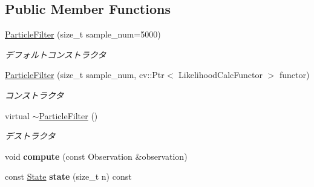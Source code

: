 \subsection*{Public Member Functions}
\begin{DoxyCompactItemize}
\item 
\hypertarget{classskl_1_1_particle_filter_acb38d20f662a6c11bdae4f52f5527943}{}\label{classskl_1_1_particle_filter_acb38d20f662a6c11bdae4f52f5527943} 
\hyperlink{classskl_1_1_particle_filter_acb38d20f662a6c11bdae4f52f5527943}{Particle\+Filter} (size\+\_\+t sample\+\_\+num=5000)
\begin{DoxyCompactList}\small\item\em デフォルトコンストラクタ \end{DoxyCompactList}\item 
\hypertarget{classskl_1_1_particle_filter_a20b8b32eb36de639b614dc3d48e1aa22}{}\label{classskl_1_1_particle_filter_a20b8b32eb36de639b614dc3d48e1aa22} 
\hyperlink{classskl_1_1_particle_filter_a20b8b32eb36de639b614dc3d48e1aa22}{Particle\+Filter} (size\+\_\+t sample\+\_\+num, cv\+::\+Ptr$<$ Likelihood\+Calc\+Functor $>$ functor)
\begin{DoxyCompactList}\small\item\em コンストラクタ \end{DoxyCompactList}\item 
\hypertarget{classskl_1_1_particle_filter_a064210a454753bd675b05b4c7606cfe0}{}\label{classskl_1_1_particle_filter_a064210a454753bd675b05b4c7606cfe0} 
virtual \hyperlink{classskl_1_1_particle_filter_a064210a454753bd675b05b4c7606cfe0}{$\sim$\+Particle\+Filter} ()
\begin{DoxyCompactList}\small\item\em デストラクタ \end{DoxyCompactList}\item 
\hypertarget{classskl_1_1_particle_filter_ab9a3888afe33833f9b764e5c60645758}{}\label{classskl_1_1_particle_filter_ab9a3888afe33833f9b764e5c60645758} 
void {\bfseries compute} (const Observation \&observation)
\item 
\hypertarget{classskl_1_1_particle_filter_a6ec47ece53b23a5905c89029c2a537d9}{}\label{classskl_1_1_particle_filter_a6ec47ece53b23a5905c89029c2a537d9} 
const \hyperlink{classskl_1_1_particle_filter_1_1_state}{State} {\bfseries state} (size\+\_\+t n) const
\item 
\hypertarget{classskl_1_1_particle_filter_ab74ab71fab3e103a09e72778eb2624d5}{}\label{classskl_1_1_particle_filter_ab74ab71fab3e103a09e72778eb2624d5} 

\end{DoxyCompactItemize}
